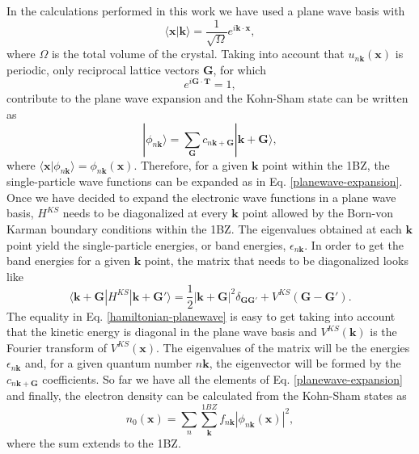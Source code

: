 In the calculations performed in this work we have used a plane wave basis with
\begin{equation}
 \langle\mathbf{x}|\mathbf{k}\rangle=\frac{1}{\sqrt{\Omega}}e^{i\mathbf{k}\cdot\mathbf{x}},
\end{equation} 
where $\Omega$ is the total volume of the crystal. Taking into account that $u_{n\mathbf{k}}(\mathbf{x})$ is periodic, only reciprocal lattice vectors $\mathbf{G}$, for which
\begin{equation}
 e^{i\mathbf{G}\cdot\mathbf{T}}=1,
\end{equation}
contribute to the plane wave expansion and the Kohn-Sham state can be written as
\begin{equation}
 \label{planewave-expansion}
 |\phi_{n\mathbf{k}}\rangle=\sum_{\mathbf{G}}c_{n\mathbf{k}+\mathbf{G}}|\mathbf{k}+\mathbf{G}\rangle,
\end{equation}
where $\langle\mathbf{x}|\phi_{n\mathbf{k}}\rangle=\phi_{n\mathbf{k}}(\mathbf{x})$. Therefore, for a given $\mathbf{k}$ point within the 1BZ, the single-particle wave functions can be expanded as in 
Eq. \ref{planewave-expansion}. \\

Once we have decided to expand the electronic wave functions in a plane wave basis, $H^{KS}$ needs to be diagonalized at every $\mathbf{k}$ point allowed by the Born-von Karman boundary conditions within the 1BZ. The 
eigenvalues obtained at each $\mathbf{k}$ point yield the single-particle energies, or band energies, $\epsilon_{n\mathbf{k}}$. In order to get the band energies for a given $\mathbf{k}$ point, the matrix that needs 
to be diagonalized looks like
\begin{equation}
\label{hamiltonian-planewave}
\langle\mathbf{k}+\mathbf{G}|H^{KS}|\mathbf{k}+\mathbf{G}'\rangle=\frac{1}{2}|\mathbf{k}+\mathbf{G}|^{2}\delta_{\mathbf{G}\mathbf{G}'}+V^{KS}(\mathbf{G}-\mathbf{G}').
\end{equation} 
The equality in Eq. \ref{hamiltonian-planewave} is easy to get taking into account that the kinetic energy is diagonal in the plane wave basis and $V^{KS}(\mathbf{k})$ is the Fourier transform of $V^{KS}(\mathbf{x})$. The eigenvalues 
of the matrix will be the energies $\epsilon_{n\mathbf{k}}$ and, for a given quantum number $n\mathbf{k}$, the eigenvector will be formed by the $c_{n\mathbf{k}+\mathbf{G}}$ coefficients. So far we have all the elements of 
Eq. \ref{planewave-expansion} and finally, the electron density can be calculated from the Kohn-Sham states as
\begin{equation}
 n_{0}(\mathbf{x})=\sum_{n}\sum_{\mathbf{k}}^{1BZ}f_{n\mathbf{k}}|\phi_{n\mathbf{k}}(\mathbf{x})|^{2},
\end{equation}
where the sum extends to the 1BZ.

